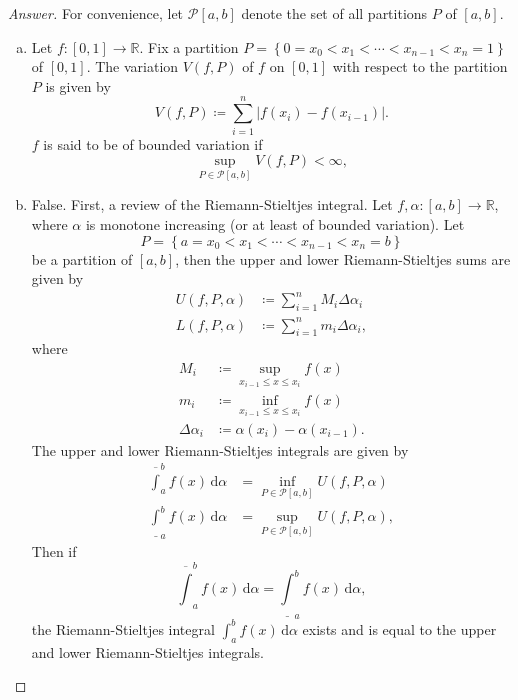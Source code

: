 \documentclass[12pt]{article}
\newcommand{\real}{\mathbb{R}}
\newcommand\setb[1]{\left \{ #1 \right \}}
\theoremstyle{definition}
\begin{document}
\begin{proof}[Answer]
    For convenience, let $\mathscr{P}[a,b]$ denote the set of all partitions $P$ of $[a,b]$.
    \begin{enumerate}[a.]
        \item Let $f : [0,1] \to \real$. Fix a partition $P = \setb{ 0 = x_0 < x_1 < \dotsb < x_{n-1} < x_n = 1 }$ of $[0,1]$. The variation $V(f,P)$ of $f$ on $[0,1]$ with respect to the partition $P$ is given by 
        \[
            V(f,P) \coloneqq \sum\limits_{i = 1}^n \left| f(x_i) - f(x_{i-1}) \right|.
        \]
        $f$ is said to be of bounded variation if 
        \[
            \sup\limits_{P \in \mathscr{P}[a,b] } V(f,P) < \infty,
        \]
        \item False. First, a review of the Riemann-Stieltjes integral. Let $f , \alpha : [a,b] \to \real$, where $\alpha$ is monotone increasing (or at least of bounded variation). Let 
        \[
            P = \setb{ a = x_0 < x_1 < \dotsb < x_{n-1} < x_n = b }
        \]
        be a partition of $[a,b]$, then the upper and lower Riemann-Stieltjes sums are given by 
        \begin{align*}
            U(f,P,\alpha) & \coloneqq \sum\limits_{i = 1}^n M_i \Delta \alpha_i \\
            L(f,P,\alpha) & \coloneqq \sum\limits_{i = 1}^n m_i \Delta \alpha_i,
        \end{align*}
        where 
        \begin{align*}
             M_i & \coloneqq \sup\limits_{x_{i-1} \leq x \leq x_i } f(x) \\ 
             m_i & \coloneqq \inf\limits_{x_{i-1} \leq x \leq x_i } f(x) \\
            \Delta \alpha_i & \coloneqq \alpha(x_i) - \alpha(x_{i-1}).
        \end{align*}
        The upper and lower Riemann-Stieltjes integrals are given by 
        \begin{align*}
            \overline{\int}_a^b f(x) \, \mathrm{d}\alpha & = \inf\limits_{P \in \mathscr{P}[a,b] } U(f,P,\alpha) \\
            \underline{\int}_a^b f(x) \, \mathrm{d}\alpha & = \sup\limits_{ P \in \mathscr{P}[a,b] } U(f,P,\alpha),
        \end{align*}
        Then if
        \[
            \overline{\int}_a^b f(x) \, \mathrm{d}\alpha = \underline{\int}_a^b f(x) \, \mathrm{d}\alpha,
        \]
        the Riemann-Stieltjes integral $\int_a^b f(x) \, \mathrm{d}\alpha$ exists and is equal to the upper and lower Riemann-Stieltjes integrals. 
        

\end{enumerate}
\end{proof}
\end{document}

